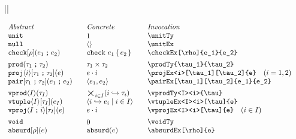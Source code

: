 \documentclass[11pt]{article}
\begin{document}
\begin{figure}
  ||
  \begin{small}
    \begin{displaymath}
      \begin{array}{l@{\qquad}l@{\qquad}l@{\qquad}l}
        \textit{Abstract} & \textit{Concrete} & \textit{Invocation} \\
        \unitTy                           & \unitTy*                 & \verb|\unitTy|                                \\
        \unitEx                           & \unitEx*                 & \verb|\unitEx|                                \\
        \checkEx[\rho]{e_1}{e_2}          & \checkEx*{e_1}{e_2}       & \verb|\checkEx[\rho]{e_1}{e_2}|                \\[1ex]
        
        \prodTy{\tau_1}{\tau_2}           & \prodTy*{\tau_1}{\tau_2} & \verb|\prodTy{\tau_1}{\tau_2}|                \\
        \projEx<i>{e}                     & \projEx*<i>{e}           & \verb|\projEx<i>[\tau_1][\tau_2]{e}| \quad (i=1,2)            \\
        \pairEx[\tau_1][\tau_2]{e_1}{e_2} & \pairEx*{e_1}{e_2}       & \verb|\pairEx[\tau_1][\tau_2]{e_1}{e_2}|      \\[1ex]

        \vprodTy<I><i>{\tau}              & \vprodTy*<I><i>{\tau}          & \verb|\vprodTy<I><i>{\tau}|                   \\
        \vtupleEx<I><i>[\tau]{e}             & \vtupleEx*<I><i>{e}         & \verb|\vtupleEx<I><i>[\tau]{e}|                  \\
        \vprojEx<I><i>[\tau]{e}           & \vprojEx*<I><i>{e}          & \verb|\vprojEx<I><i>[\tau]{e}| \quad (i\in I) \\[1ex]

        \voidTy                           & \voidTy*                & \verb|\voidTy|                                    \\
        \absurdEx[\rho]{e}                & \absurdEx*{e}           & \verb|\absurdEx[\rho]{e}|                         \\[1ex]


\end{array}
\end{displaymath}
\end{small}
\end{figure}
\end{document}
